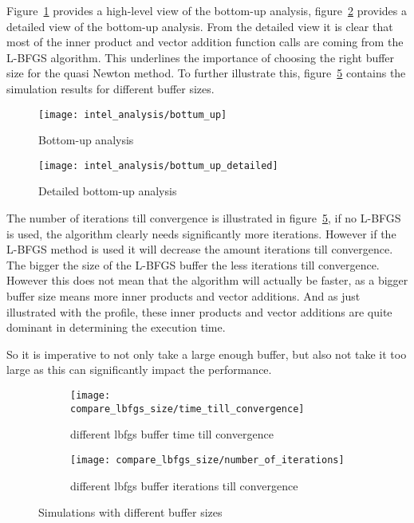Figure~\ref{fig:bottom-up analysis} provides a high-level view of the bottom-up analysis, figure~\ref{fig:detailed bottom-up analysis} provides a detailed view of the bottom-up analysis. From the detailed view it is clear that most of the inner product and vector addition function calls are coming from the L-BFGS algorithm. This underlines the importance of choosing the right buffer size for the quasi Newton method. To further illustrate this, figure~\ref{fig:Simulations with different buffer sizes} contains the simulation results for different buffer sizes.

\begin{figure}[H]
	\centering
	\texttt{[image: intel\_analysis/bottum\_up]}
	\caption{Bottom-up analysis}
	\label{fig:bottom-up analysis}
\end{figure}

\begin{figure}[H]
	\centering
	\texttt{[image: intel\_analysis/bottum\_up\_detailed]}
	\caption{Detailed bottom-up analysis}
	\label{fig:detailed bottom-up analysis}
\end{figure}

The number of iterations till convergence is illustrated in figure~\ref{fig:Simulations with different buffer sizes}, if no L-BFGS is used, the algorithm clearly needs significantly more iterations. However if the L-BFGS method is used it will decrease the amount iterations till convergence. The bigger the size of the L-BFGS buffer the less iterations till convergence. However this does not mean that the algorithm will actually be faster, as a bigger buffer size means more inner products and vector additions. And as just illustrated with the profile, these inner products and vector additions are quite dominant in determining the execution time.

So it is imperative to not only take a large enough buffer, but also not take it too large as this can significantly impact the performance.

\begin{figure}[H]
	\centering
	\begin{subfigure}[b]{0.45\textwidth}
		\centering
		\texttt{[image: compare\_lbfgs\_size/time\_till\_convergence]}
		\caption{different lbfgs buffer time till convergence}
		\label{fig:different lbfgs buffer time till convergence}
	\end{subfigure}
	\hfill
	\begin{subfigure}[b]{0.45\textwidth}
		\centering
		\texttt{[image: compare\_lbfgs\_size/number\_of\_iterations]}
		\caption{different lbfgs buffer iterations till convergence}
		\label{fig:different lbfgs buffer iterations till convergence}
	\end{subfigure}
	\caption{Simulations with different buffer sizes}
	\label{fig:Simulations with different buffer sizes}
\end{figure}


